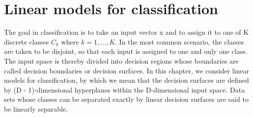 \documentclass[../main.tex]{subfiles}
\begin{document}
\section{Linear models for classification}
The goal in classification is to take an
input vector x and to assign it to one of K discrete classes $C_k$ where $k = 1,...,K$.
In the most common scenario, the classes are taken to be disjoint, so that each input is
assigned to one and only one class. The input space is thereby divided into decision
regions whose boundaries are called decision boundaries or decision surfaces. In
this chapter, we consider linear models for classification, by which we mean that the
decision surfaces are defined by (D - 1)-dimensional hyperplanes within the D-dimensional input space. Data
sets whose classes can be separated exactly by linear decision surfaces are said to be
linearly separable.
\end{document}
